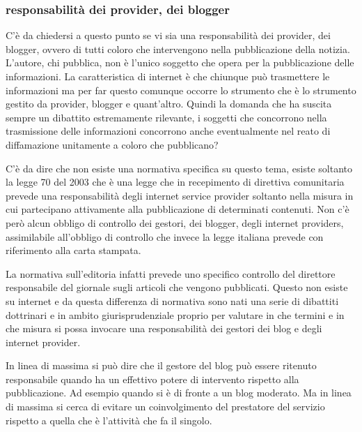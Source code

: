  \subsubsection{responsabilità dei provider, dei blogger}
 C'è da chiedersi a questo punto se vi sia una responsabilità dei provider, dei blogger, ovvero di tutti coloro che intervengono nella pubblicazione della notizia. L'autore, chi pubblica, non è l'unico soggetto che opera per la pubblicazione delle informazioni. La caratteristica di internet è che chiunque può trasmettere le informazioni ma per far questo comunque occorre lo strumento che è lo strumento gestito da provider, blogger e quant'altro. Quindi la domanda che ha suscita sempre un dibattito estremamente rilevante, i soggetti che concorrono nella trasmissione delle informazioni concorrono anche eventualmente nel reato di diffamazione unitamente a coloro che pubblicano?\par
 C'è da dire che non esiste una normativa specifica su questo tema, esiste soltanto la legge 70 del 2003 che è una legge che in recepimento di direttiva comunitaria prevede una responsabilità degli internet service provider soltanto nella misura in cui partecipano attivamente alla pubblicazione di determinati contenuti. Non c'è però alcun obbligo di controllo dei gestori, dei blogger, degli internet providers, assimilabile all'obbligo di controllo che invece la legge italiana prevede con riferimento alla carta stampata.\par
 La normativa sull'editoria infatti prevede uno specifico controllo del direttore responsabile del giornale sugli articoli che vengono pubblicati. Questo non esiste su internet e da questa differenza di normativa sono nati una serie di dibattiti dottrinari e in ambito giurisprudenziale proprio per valutare in che termini e in che misura si possa invocare una responsabilità dei gestori dei blog e degli internet provider.\par
 In linea di massima si può dire che il gestore del blog può essere ritenuto responsabile quando ha un effettivo potere di intervento rispetto alla pubblicazione. Ad esempio quando si è di fronte a un blog moderato. Ma in linea di massima si cerca di evitare un coinvolgimento del prestatore del servizio rispetto a quella che è l'attività che fa il singolo.\par
